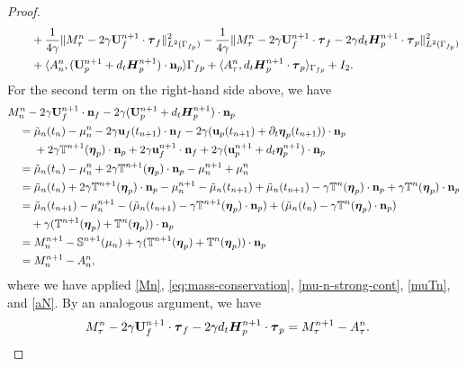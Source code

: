 \documentclass[11pt]{article}
\def\u{{\bf u}}
\def\n{{\bf n}}
\def\btau{\boldsymbol{\tau}}
\def\bbeta{\boldsymbol{\eta}}
\def\U{{\bf U}}
\def\E{\boldsymbol{H}}
\def\d{\partial}
\def\<{\langle}
\def\>{\rangle}
\def\ddt{d_t}
\begin{document}
\begin{proof}
\begin{align}
&\qquad + \frac{1}{4\gamma}\|M_\tau^n - 2\gamma \U_f^{n+1} \cdot \btau_f\|_{L^2(\Gamma_{f_p})}^2 - \frac{1}{4\gamma} \| M_\tau^n - 2\gamma \U_f^{n+1} \cdot \btau_f - 2 \gamma \ddt \E_p^{n+1}\cdot \btau_p \|_{L^2(\Gamma_{f_p})}^2\nonumber\\
&\qquad + \<A_n^n,(\U_p^{n+1} + \ddt \E_p^{n+1})\cdot \n_p\>{\Gamma_{fp}}+ \<A_\tau^n,\ddt \E_p^{n+1}\cdot \btau_p\>_{\Gamma_{fp}}+ I_2. \label{eq:Biot_error}
\end{align}
%
For the second term on the right-hand side above, we have
\begin{alignat}{1}
&M_n^n - 2\gamma \U_f^{n+1} \cdot \n_f - 2\gamma(\U_p^{n+1} + \ddt \E_p^{n+1})\cdot \n_p  \\
&\quad = \tilde{\mu}_n(t_n) - \mu_n^n - 2\gamma \u_f(t_{n+1})\cdot \n_f -2\gamma(\u_p(t_{n+1}) + \d_t \bbeta_p(t_{n+1}))\cdot\n_p \nonumber\\
&\quad \quad \ + 2 \gamma \mathbb{T}^{n+1}( \bbeta_p)\cdot \n_p  + 2\gamma \u_f^{n+1}\cdot \n_f + 2\gamma(\u_p^{n+1} + \ddt \bbeta_p^{n+1})\cdot\n_p\nonumber\\
&\quad = \tilde{\mu}_n(t_n) - \mu_n^n + 2 \gamma \mathbb{T}^{n+1}( \bbeta_p)\cdot \n_p - \mu_n^{n+1} + \mu_n^n \nonumber\\
&\quad = \tilde{\mu}_n(t_n) + 2\gamma \mathbb{T}^{n+1}( \bbeta_p)\cdot \n_p - \mu_n^{n+1} - \tilde{\mu}_n(t_{n+1}) + \tilde{\mu}_n(t_{n+1})  
  - \gamma \mathbb{T}^n(\bbeta_p)\cdot \n_p + \gamma \mathbb{T}^n(\bbeta_p)\cdot \n_p
  \nonumber\\
  &\quad = \tilde{\mu}_n(t_{n+1}) - \mu_n^{n+1}
  - (\tilde{\mu}_n(t_{n+1}) - \gamma \mathbb{T}^{n+1}( \bbeta_p)\cdot \n_p) + (\tilde{\mu}_n(t_{n}) - \gamma \mathbb{T}^{n}( \bbeta_p)\cdot \n_p)
  \nonumber\\
&\quad \quad
+ \gamma(\mathbb{T}^{n+1} (\bbeta_p) + \mathbb{T}^{n}(\bbeta_p))\cdot \n_p \nonumber\\
&\quad = M_n^{n+1} - \mathbb{S}^{n+1}(\mu_n) + \gamma(\mathbb{T}^{n+1} (\bbeta_p) + \mathbb{T}^{n}(\bbeta_p))\cdot \n_p \nonumber\\
&\quad = M_n^{n+1} - A_n^n, \label{nSide}
\end{alignat}
%
where we have applied \eqref{Mn}, \eqref{eq:mass-conservation}, \eqref{mu-n-strong-cont}, \eqref{muTn}, and \eqref{aN}. By an analogous argument, we have
%
\begin{alignat}{1}
  &M_\tau^n - 2\gamma \U_f^{n+1} \cdot \btau_f - 2 \gamma \ddt \E_p^{n+1}\cdot \btau_p  = M_\tau^{n+1} - A_\tau^n.
  \label{tauSide}
\end{alignat}

\end{proof}
\end{document}
